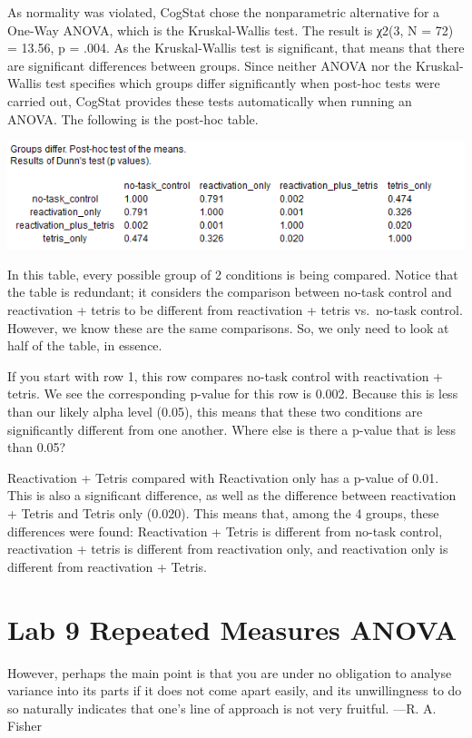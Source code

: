 \documentclass[
]{book}
\begin{document}
As normality was violated, CogStat chose the nonparametric alternative for a One-Way ANOVA, which is the Kruskal-Wallis test. The result is χ2(3, N = 72) = 13.56, p = .004. As the Kruskal-Wallis test is significant, that means that there are significant differences between groups. Since neither ANOVA nor the Kruskal-Wallis test specifies which groups differ significantly when post-hoc tests were carried out, CogStat provides these tests automatically when running an ANOVA. The following is the post-hoc table.

\includegraphics{img/ch8/8.3comparegroups_posthoc.png}

In this table, every possible group of 2 conditions is being compared. Notice that the table is redundant; it considers the comparison between no-task control and reactivation + tetris to be different from reactivation + tetris vs.~no-task control. However, we know these are the same comparisons. So, we only need to look at half of the table, in essence.

If you start with row 1, this row compares no-task control with reactivation + tetris. We see the corresponding p-value for this row is 0.002. Because this is less than our likely alpha level (0.05), this means that these two conditions are significantly different from one another. Where else is there a p-value that is less than 0.05?

Reactivation + Tetris compared with Reactivation only has a p-value of 0.01. This is also a significant difference, as well as the difference between reactivation + Tetris and Tetris only (0.020). This means that, among the 4 groups, these differences were found: Reactivation + Tetris is different from no-task control, reactivation + tetris is different from reactivation only, and reactivation only is different from reactivation + Tetris.

\hypertarget{lab-9-repeated-measures-anova}{%
\chapter{Lab 9 Repeated Measures ANOVA}\label{lab-9-repeated-measures-anova}}

{
However, perhaps the main point is that you are under no obligation to analyse variance into its parts if it does not come apart easily, and its unwillingness to do so naturally indicates that one's line of approach is not very fruitful.
---R. A. Fisher
}
\end{document}
